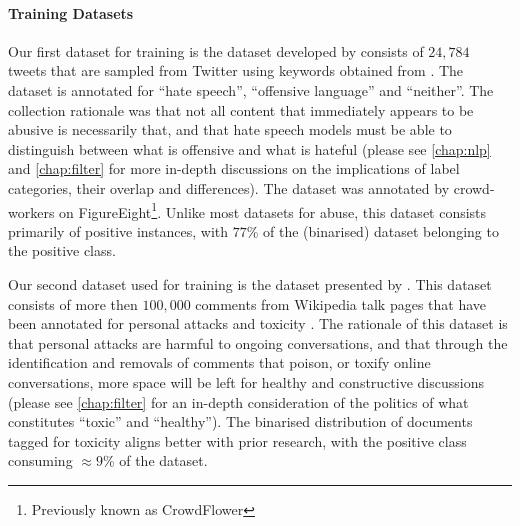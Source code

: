 \paragraph{Training Datasets}
Our first dataset for training is the dataset developed by \citet{Davidson:2017} consists of $24,784$ tweets that are sampled from Twitter using keywords obtained from \citet{Hatebase}. The dataset is annotated for ``hate speech'', ``offensive language'' and ``neither''. The collection rationale was that not all content that immediately appears to be abusive is necessarily that, and that hate speech models must be able to distinguish between what is offensive and what is hateful \cite{Davidson:2017} (please see \autoref{chap:nlp} and \autoref{chap:filter} for more in-depth discussions on the implications of label categories, their overlap and differences). The dataset was annotated by crowd-workers on FigureEight\footnote{Previously known as CrowdFlower}. Unlike most datasets for abuse, this dataset consists primarily of positive instances, with $77$\% of the (binarised) dataset belonging to the positive class.

Our second dataset used for training is the dataset presented by \citet{Wulczyn:2017}. This dataset consists of more then $100,000$ comments from Wikipedia talk pages that have been annotated for personal attacks and toxicity \cite{Wulczyn:2017}. The rationale of this dataset is that personal attacks are harmful to ongoing conversations, and that through the identification and removals of comments that poison, or toxify online conversations, more space will be left for healthy and constructive discussions (please see \autoref{chap:filter} for an in-depth consideration of the politics of what constitutes ``toxic'' and ``healthy''). The binarised distribution of documents tagged for toxicity aligns better with prior research, with the positive class consuming $\approx 9$\% of the dataset.

